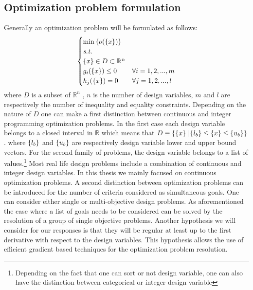 \subsection {Optimization problem formulation}
Generally an optimization problem will be formulated as follows:
\begin{equation}
\label{nlp}
\begin{cases}
\min{\ensuremath\left\lbrace{o(\ensuremath\left\lbrace{x}\right \rbrace)}\right \rbrace}\\
\textit{s.t.}\\
\left\lbrace{x}\right \rbrace\in D \subset \mathbb{R}^{n}\\
g_i(\left\lbrace{x}\right \rbrace)\leq 0 & \forall i=1,2,...,m\\
h_j(\left\lbrace{x}\right \rbrace)=0 & \forall j=1,2,...,l
\end{cases}
\end{equation}
where $D$ is a subset of $\mathbb{R}^{n}$ , $n$ is the number of design variables, $m$ and $l$ are respectively the number of inequality and equality constraints. Depending on the nature of $D$ one can make a first distinction between continuous and integer programming optimization problems. In the first case each design variable belongs to a closed interval in $\mathbb{R}$ which means that $D\equiv\lbrace \left\lbrace{x}\right \rbrace | \left\lbrace{l_b}\right \rbrace\leq\left\lbrace{x}\right \rbrace\leq \left\lbrace{u_b}\right \rbrace\rbrace$. where $\left\lbrace{l_b}\right \rbrace$ and $\left\lbrace{u_b}\right \rbrace$ are respectively design variable lower and upper bound vectors. For the second family of problems, the design variable belongs to a list of values.\footnote{Depending on the fact that one can sort or not design variable, one can also have the distinction between categorical or integer design variable} Most real life design problems include a combination of continuous and integer design variables. 
In this thesis we mainly focused on continuous optimization problems. A second distinction between optimization problems can be introduced for the number of criteria considered as simultaneous goals. One can consider either single or multi-objective design problems. As aforementioned the case where a list of goals needs to be considered can be solved by the resolution of a group of single objective problems. Another hypothesis we will consider for our responses is that they will be regular at least up to the first derivative with respect to the design variables. This hypothesis allows the use of efficient gradient based techniques for the optimization problem resolution. 
 
